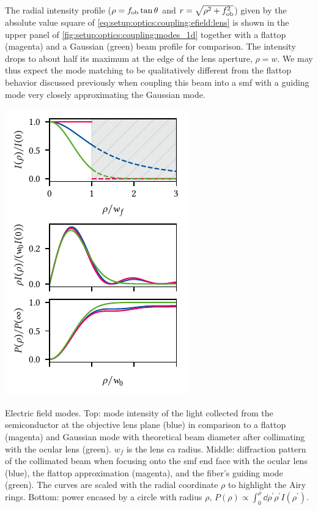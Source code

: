 The radial intensity profile ($\rho = f_{\mathrm{ob}}\tan\theta$ and $r=\sqrt{\rho^2 + f_{\mathrm{ob}}^2}$) given by the absolute value square of \cref{eq:setup:optics:coupling:efield:lens} is shown in the upper panel of \cref{fig:setup:optics:coupling:modes_1d} together with a flattop (magenta) and a Gaussian (green) beam profile for comparison.
The intensity drops to about half its maximum at the edge of the lens aperture, $\rho=w$.
We may thus expect the mode matching to be qualitatively different from the flattop behavior discussed previously when coupling this beam into a \gls{smf} with a guiding mode very closely approximating the Gaussian  mode.

\begin{marginfigure}
    \centering
    \includegraphics{img/pdf/setup/modes_1d}
    \caption[]{
        Electric field modes.
        Top: mode intensity of the light collected from the semiconductor at the objective lens plane (blue) in comparison to a flattop (magenta) and Gaussian  mode with theoretical beam diameter after collimating with the ocular lens (green).
        $w_f$ is the lens \gls{ca} radius.
        Middle: diffraction pattern of the collimated beam when focusing onto the \gls{smf} end face with the ocular lens (blue), the flattop approximation (magenta), and the fiber's guiding mode (green).
        The curves are scaled with the radial coordinate $\rho$ to highlight the Airy rings.
        Bottom: power encased by a circle with radius $\rho$, $P(\rho)\propto\int_0^{\rho}\dd{\rho^\prime} \rho^{\prime} I(\rho^{\prime})$.
    }
    \label{fig:setup:optics:coupling:modes_1d}
\end{marginfigure}

